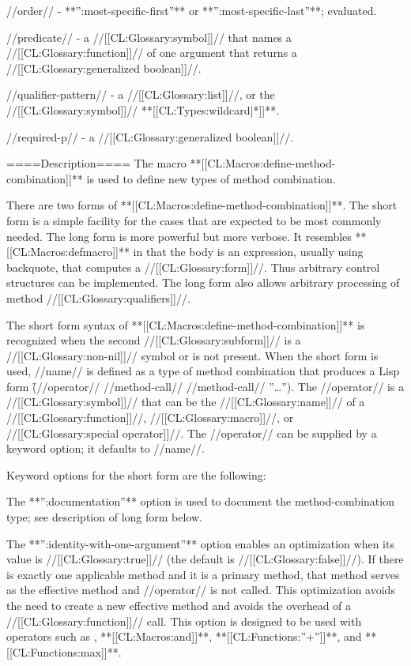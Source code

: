 //order// - **'':most-specific-first''** or **'':most-specific-last''**; evaluated.

//predicate// - a //[[CL:Glossary:symbol]]// that names a //[[CL:Glossary:function]]// of one argument that returns a //[[CL:Glossary:generalized boolean]]//.

//qualifier-pattern// - a //[[CL:Glossary:list]]//, or the //[[CL:Glossary:symbol]]// **[[CL:Types:wildcard|*]]**.

//required-p// - a //[[CL:Glossary:generalized boolean]]//.

====Description====
The macro **[[CL:Macros:define-method-combination]]** is used to define new types of method combination.

There are two forms of **[[CL:Macros:define-method-combination]]**. The short form is a simple facility for the cases that are expected to be most commonly needed. The long form is more powerful but more verbose. It resembles **[[CL:Macros:defmacro]]** in that the body is an expression, usually using backquote, that computes a //[[CL:Glossary:form]]//. Thus arbitrary control structures can be implemented. The long form also allows arbitrary processing of method //[[CL:Glossary:qualifiers]]//.

\beginlist {}

The short form syntax of **[[CL:Macros:define-method-combination]]** is recognized when the second //[[CL:Glossary:subform]]// is a //[[CL:Glossary:non-nil]]// symbol or is not present. When the short form is used, //name// is defined as a type of method combination that produces a Lisp form \f{({//operator// //method-call// //method-call// ''\ldots''})}. The //operator// is a //[[CL:Glossary:symbol]]// that can be the //[[CL:Glossary:name]]// of a //[[CL:Glossary:function]]//, //[[CL:Glossary:macro]]//, or //[[CL:Glossary:special operator]]//. The //operator// can be supplied by a keyword option; it defaults to //name//.

Keyword options for the short form are the following:

\beginlist

\itemitem{\bull} The **'':documentation''** option is used to document the method-combination type; see description of long form below.

\itemitem{\bull} The **'':identity-with-one-argument''** option enables an optimization when its value is //[[CL:Glossary:true]]// (the default is //[[CL:Glossary:false]]//). If there is exactly one applicable method and it is a primary method, that method serves as the effective method and //operator// is not called. This optimization avoids the need to create a new effective method and avoids the overhead of a //[[CL:Glossary:function]]// call. This option is designed to be used with operators such as , **[[CL:Macros:and]]**, **[[CL:Functions:''+'']]**, and **[[CL:Functions:max]]**.

